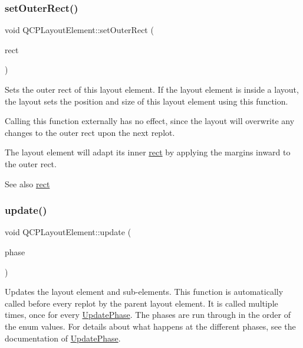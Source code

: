 \subsubsection{\texorpdfstring{set\+Outer\+Rect()}{setOuterRect()}}
{\footnotesize\ttfamily void Q\+C\+P\+Layout\+Element\+::set\+Outer\+Rect (\begin{DoxyParamCaption}\item[{const Q\+Rect \&}]{rect }\end{DoxyParamCaption})}

Sets the outer rect of this layout element. If the layout element is inside a layout, the layout sets the position and size of this layout element using this function.

Calling this function externally has no effect, since the layout will overwrite any changes to the outer rect upon the next replot.

The layout element will adapt its inner \hyperlink{class_q_c_p_layout_element_a208effccfe2cca4a0eaf9393e60f2dd4}{rect} by applying the margins inward to the outer rect.

\begin{DoxySeeAlso}{See also}
\hyperlink{class_q_c_p_layout_element_a208effccfe2cca4a0eaf9393e60f2dd4}{rect} 
\end{DoxySeeAlso}
\mbox{\label{class_q_c_p_layout_element_a929c2ec62e0e0e1d8418eaa802e2af9b}} 
\subsubsection{\texorpdfstring{update()}{update()}}
{\footnotesize\ttfamily void Q\+C\+P\+Layout\+Element\+::update (\begin{DoxyParamCaption}\item[{\hyperlink{class_q_c_p_layout_element_a0d83360e05735735aaf6d7983c56374d}{Update\+Phase}}]{phase }\end{DoxyParamCaption})\hspace{0.3cm}{\ttfamily [virtual]}}

Updates the layout element and sub-\/elements. This function is automatically called before every replot by the parent layout element. It is called multiple times, once for every \hyperlink{class_q_c_p_layout_element_a0d83360e05735735aaf6d7983c56374d}{Update\+Phase}. The phases are run through in the order of the enum values. For details about what happens at the different phases, see the documentation of \hyperlink{class_q_c_p_layout_element_a0d83360e05735735aaf6d7983c56374d}{Update\+Phase}.

